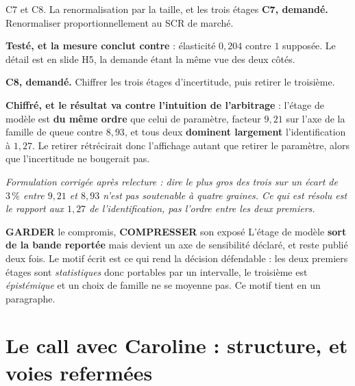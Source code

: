 \documentclass[11pt]{beamer}
\newcommand{\garder}{\textbf{GARDER}}
\newcommand{\compresser}{\textbf{COMPRESSER}}
\newcommand{\srcs}[1]{\vspace{0.8mm}{\tiny\textcolor{gray!50!black}{Sources : #1}}}
\begin{document}
\begin{frame}{C7 et C8. La renormalisation par la taille, et les trois étages}
\scriptsize
\textbf{C7, demandé.} Renormaliser proportionnellement au SCR de marché.
\vspace{1mm}

\textbf{Testé, et la mesure conclut contre} : élasticité $0{,}204$ contre $1$ supposée. Le détail
est en slide H5, la demande étant la même vue des deux côtés.
\vspace{1mm}

\textbf{C8, demandé.} Chiffrer les trois étages d'incertitude, puis retirer le troisième.
\vspace{1mm}

\textbf{Chiffré, et le résultat va contre l'intuition de l'arbitrage} : l'étage de modèle est
\textbf{du même ordre} que celui de paramètre, facteur $9{,}21$ sur l'axe de la famille de queue
contre $8{,}93$, et tous deux \textbf{dominent largement} l'identification à $1{,}27$. Le
retirer rétrécirait donc l'affichage autant que retirer le paramètre, alors que l'incertitude ne
bougerait pas.
\vspace{0.5mm}

\emph{Formulation corrigée après relecture : dire \og le plus gros des trois \fg{} sur un écart
de $3\,\%$ entre $9{,}21$ et $8{,}93$ n'est pas soutenable à quatre graines. Ce qui est résolu
est le rapport aux $1{,}27$ de l'identification, pas l'ordre entre les deux premiers.}
\begin{block}{\garder{} le compromis, \compresser{} son exposé}
L'étage de modèle \textbf{sort de la bande reportée} mais devient un axe de sensibilité déclaré,
et reste publié deux fois. Le motif écrit est ce qui rend la décision défendable : les deux
premiers étages sont \emph{statistiques} donc portables par un intervalle, le troisième est
\emph{épistémique} et un choix de famille ne se moyenne pas. Ce motif tient en un paragraphe.
\end{block}
\srcs{scripts~\texttt{48}, \texttt{70} et~\texttt{71}}
\end{frame}

\section*{Le call avec Caroline : structure, et voies refermées}
\end{document}
